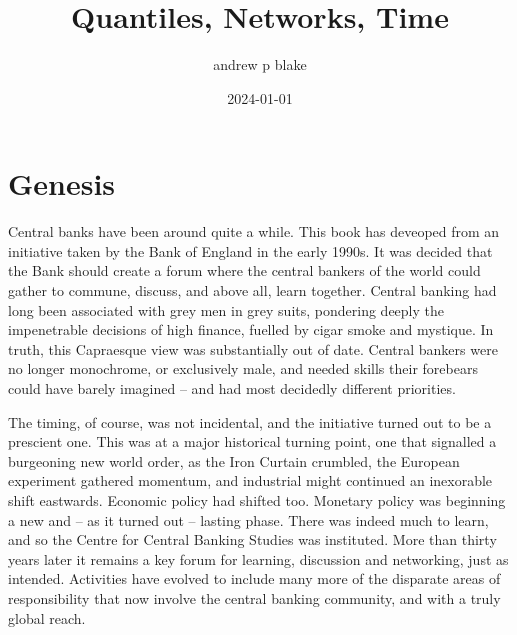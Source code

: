 \documentclass[
  letterpaper,
]{book}
\title{Quantiles, Networks, Time}
\author{andrew p blake}
\date{2024-01-01}
\renewcommand*\contentsname{Table of contents}
\newcommand\contentsname{Table of contents}
\begin{document}
\frontmatter
\maketitle
\ifdefined\Shaded\renewenvironment{Shaded}{\begin{tcolorbox}[frame hidden, breakable, borderline west={3pt}{0pt}{shadecolor}, interior hidden, boxrule=0pt, enhanced, sharp corners]}{\end{tcolorbox}}\fi

\renewcommand*\contentsname{Table of contents}
{
\setcounter{tocdepth}{2}
\tableofcontents
}
\listoffigures
\listoftables
\mainmatter
{}

\hypertarget{sec-genesis}{%
\chapter*{Genesis}\label{sec-genesis}}


Central banks have been around quite a while. This book has deveoped
from an initiative taken by the Bank of England in the early 1990s. It
was decided that the Bank should create a forum where the central
bankers of the world could gather to commune, discuss, and above all,
learn together. Central banking had long been associated with grey men
in grey suits, pondering deeply the impenetrable decisions of high
finance, fuelled by cigar smoke and mystique. In truth, this Capraesque
view was substantially out of date. Central bankers were no longer
monochrome, or exclusively male, and needed skills their forebears could
have barely imagined -- and had most decidedly different priorities.

The timing, of course, was not incidental, and the initiative turned out
to be a prescient one. This was at a major historical turning point, one
that signalled a burgeoning new world order, as the Iron Curtain
crumbled, the European experiment gathered momentum, and industrial
might continued an inexorable shift eastwards. Economic policy had
shifted too. Monetary policy was beginning a new and -- as it turned out
-- lasting phase. There was indeed much to learn, and so the Centre for
Central Banking Studies was instituted. More than thirty years later it
remains a key forum for learning, discussion and networking, just as
intended. Activities have evolved to include many more of the disparate
areas of responsibility that now involve the central banking community,
and with a truly global reach.
\end{document}
